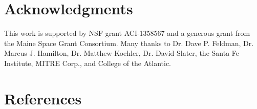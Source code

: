 \documentclass[12pt]{article}
\begin{document}
\newpage
\section{Acknowledgments}
This work is supported by NSF grant ACI-1358567 and a generous grant from the Maine Space Grant Consortium. Many thanks to Dr. Dave P. Feldman, Dr. Marcus J. Hamilton, Dr. Matthew Koehler, Dr. David Slater, the Santa Fe Institute, MITRE Corp., and College of the Atlantic. 
\newpage
\section{References}

\begingroup
\renewcommand{\section}[2]{}%

\endgroup
\newpage

\end{document}
